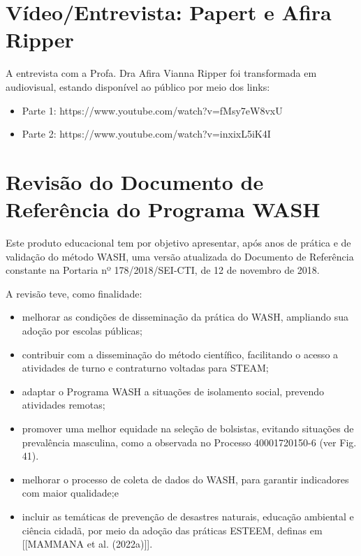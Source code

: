 \section[Vídeo/Entrevista: Papert e Afira Ripper]{Vídeo/Entrevista: Papert e Afira Ripper}\label{Vídeo/Entrevista: Papert e Afira Ripper}
A entrevista com a Profa. Dra Afira Vianna Ripper foi transformada em audiovisual, estando disponível ao público por meio dos links:


\begin{itemize}
\item Parte 1: https://www.youtube.com/watch?v=fMsy7eW8vxU
\item Parte 2: https://www.youtube.com/watch?v=inxixL5iK4I
\end{itemize}

\section[Revisão do Documento de Referência do Programa WASH]{Revisão do Documento de Referência do Programa WASH}\label{Revisão do Documento de Referência do Programa WASH}
Este produto educacional tem por objetivo apresentar, após anos de prática e de validação do método WASH, uma versão atualizada do Documento de Referência constante na Portaria nº 178/2018/SEI-CTI, de 12 de novembro de 2018.

A revisão teve, como finalidade:


\begin{itemize}
\item melhorar as condições de disseminação da prática do WASH, ampliando sua adoção por escolas públicas;
\item contribuir com a disseminação do método científico, facilitando o acesso a atividades de turno e contraturno voltadas para STEAM;
\item adaptar o Programa WASH a situações de isolamento social, prevendo atividades remotas;
\item promover uma melhor equidade na seleção de bolsistas, evitando situações de prevalência masculina, como a observada no Processo 40001720150-6 (ver Fig. 41).
\item melhorar o processo de coleta de dados do WASH, para garantir indicadores com maior qualidade;e
\item incluir as temáticas de prevenção de desastres naturais, educação ambiental e ciência cidadã, por meio da adoção das práticas ESTEEM, definas em  [[MAMMANA et al. (2022a)]].
\end{itemize}

